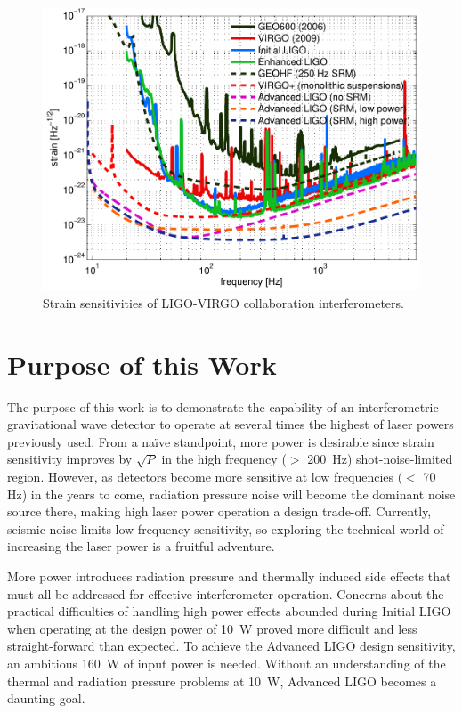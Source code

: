 \begin{figure}
\begin{centering}
\includegraphics[width=1.0\textwidth]{figures/GWnetwork_strains.pdf}
\caption[Strain sensitivities of LIGO-VIRGO collaboration
interferometers]{Strain sensitivities of LIGO-VIRGO collaboration
  interferometers.}
\label{fig:h_all}
\end{centering}
\end{figure}


\section{Purpose of this Work}
The purpose of this work is to demonstrate the capability of an
interferometric gravitational wave detector to operate at several
times the highest of laser powers previously used. From a na\"ive
standpoint, more power is desirable since strain sensitivity improves
by $\sqrt{P}$ in the high frequency ($>$ 200~Hz) shot-noise-limited
region. However, as detectors become more sensitive at low frequencies
($<$ 70 Hz) in the years to come, radiation pressure noise will become
the dominant noise source there, making high laser power operation a
design trade-off. Currently, seismic noise limits low frequency
sensitivity, so exploring the technical world of increasing the laser
power is a fruitful adventure.

More power introduces radiation pressure and thermally induced side
effects that must all be addressed for effective interferometer
operation. Concerns about the practical difficulties of handling high
power effects abounded during Initial LIGO when operating at the
design power of 10~W proved more difficult and less straight-forward
than expected. To achieve the Advanced LIGO design sensitivity, an
ambitious 160~W of input power is needed. Without an understanding of
the thermal and radiation pressure problems at 10~W, Advanced LIGO
becomes a daunting goal.

